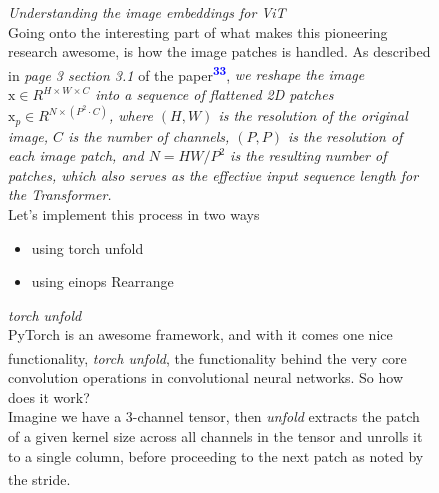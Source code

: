 \documentclass[12pt]{article}
\newcommand{\customtext}[3]{%
    \vspace{#2} %
    \fontsize{13}{8}\textcolor{#1}{\textit{#3}}%
}
\newcommand{\sidecite}[1]{\textsuperscript{\textcolor{blue}{\textbf{\scriptsize#1}}}}
\newcommand{\customtitle}[1]{\fontsize{14}{8}\textcolor{xtitle}{\textit{#1}}\\}
\newcommand{\maincitecount}{\sidecite{\stepcounter{maincite}\themaincite}}
\begin{document}
\begin{figure}[!htb]
    \begin{minipage}[t]{0.65\textwidth}
    \raggedright
    \customtext{xtitle}{0em}{Understanding the image embeddings for ViT}\\
    Going onto the interesting part of what makes this pioneering research awesome, 
    is how the image patches is handled.
    As described in {\it page 3 section 3.1} of the paper\sidecite{33},
    {\it\small we reshape the image $\text{x}\in R^{H\times W\times C}$ into a 
    sequence of flattened 2D patches $\text{x}_p\in R^{N\times (P^2\cdot C)}$,
    where $(H,W)$ is the resolution of the original image, $C$ is the number 
    of channels, $(P,P)$ is the resolution of each image patch, and $N = HW/P^2$ 
    is the resulting number of patches, which also serves as the effective 
    input sequence length for the Transformer.}
    \vspace{0.5em}\\
    Let's implement this process in two ways
    \begin{itemize}[left=0pt,topsep=0pt,itemsep=-1ex,parsep=0ex]
        \item using torch unfold
        \item using einops Rearrange
      \end{itemize}
      \vspace{1em}
      \customtitle{torch unfold}
      PyTorch is an awesome framework, and with it comes one nice functionality, 
      {\it torch unfold}{\maincitecount}, the functionality behind the very core 
      convolution operations in convolutional neural networks. So how does it work?\\
      Imagine we have a 3-channel tensor, then {\it unfold} extracts the patch of a given 
      kernel size across all channels in the tensor and unrolls it to a single column, 
      before proceeding to the next patch as noted by the stride\maincitecount.
\begin{figure}[H]
\end{figure}
\end{minipage}
\end{figure}
\end{document}
